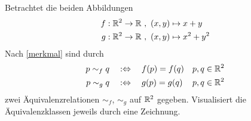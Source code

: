 \begin{aufg}[Äquivalenzklassen]
    Betrachtet die beiden Abbildungen
    \begin{align*}
        f : \mathbb R^2 \to \mathbb R \ &,\ (x,y) \mapsto x+y \\
        g : \mathbb R^2 \to \mathbb R \ &,\ (x,y) \mapsto x^2+y^2
    \end{align*}
    Nach \cref{merkmal} sind durch
    \begin{align*}
        p\sim_f q \quad &:\Leftrightarrow\quad f(p)=f(q) && p,q\in \mathbb R^2 \\
        p\sim_g q \quad &:\Leftrightarrow\quad g(p)=g(q) && p,q\in \mathbb R^2
    \end{align*}
    zwei Äquivalenzrelationen $\sim_f$, $\sim_g$ auf $\mathbb R^2$ gegeben. Visualisiert die Äquivalenzklassen jeweils durch eine Zeichnung.
\end{aufg}

